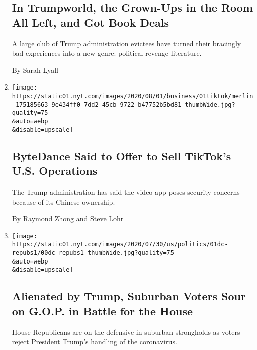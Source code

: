 \begin{enumerate}
  \hypertarget{in-trumpworld-the-grown-ups-in-the-room-all-left-and-got-book-deals-1}{%
  \subsection{In Trumpworld, the Grown-Ups in the Room All Left, and Got
  Book
  Deals}\label{in-trumpworld-the-grown-ups-in-the-room-all-left-and-got-book-deals-1}}

  A large club of Trump administration evictees have turned their
  bracingly bad experiences into a new genre: political revenge
  literature.

  By Sarah Lyall
\item
  \href{/2020/08/01/technology/tiktok-sale-trump-ban.html}{}

  \texttt{[image: https://static01.nyt.com/images/2020/08/01/business/01tiktok/merlin\_175185663\_9e434ff0-7dd2-45cb-9722-b47752b5bd81-thumbWide.jpg?quality=75\\\&auto=webp\\\&disable=upscale]}

  \hypertarget{bytedance-said-to-offer-to-sell-tiktoks-us-operations}{%
  \subsection{ByteDance Said to Offer to Sell TikTok's U.S.
  Operations}\label{bytedance-said-to-offer-to-sell-tiktoks-us-operations}}

  The Trump administration has said the video app poses security
  concerns because of its Chinese ownership.

  By Raymond Zhong and Steve Lohr
\item
  \href{/2020/08/01/us/politics/trump-suburban-voters-republicans-house.html}{}

  \texttt{[image: https://static01.nyt.com/images/2020/07/30/us/politics/01dc-repubs1/00dc-repubs1-thumbWide.jpg?quality=75\\\&auto=webp\\\&disable=upscale]}

  \hypertarget{alienated-by-trump-suburban-voters-sour-on-gop-in-battle-for-the-house}{%
  \subsection{Alienated by Trump, Suburban Voters Sour on G.O.P. in
  Battle for the
  House}\label{alienated-by-trump-suburban-voters-sour-on-gop-in-battle-for-the-house}}

  House Republicans are on the defensive in suburban strongholds as
  voters reject President Trump's handling of the coronavirus.


\end{enumerate}

